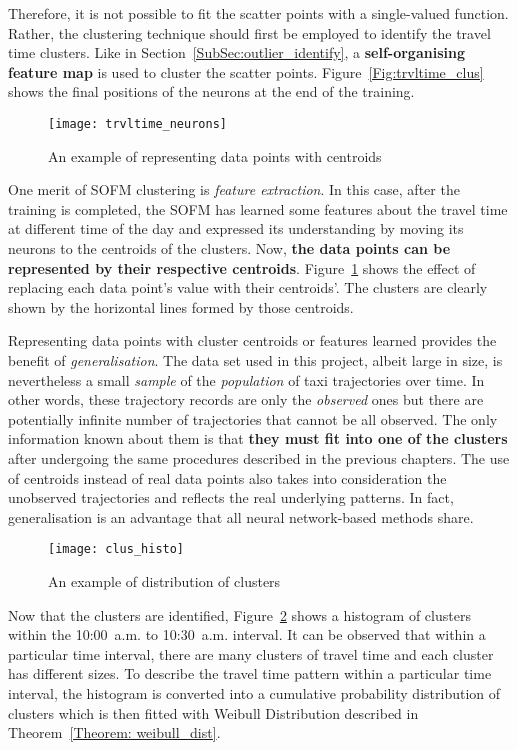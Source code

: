 Therefore, it is not possible to fit the scatter points with a single-valued function. Rather, the clustering technique should first be employed to identify the travel time clusters. Like in Section~\ref{SubSec:outlier_identify}, a \textbf{self-organising feature map} is used to cluster the scatter points. Figure~\ref{Fig:trvltime_clus} shows the final positions of the neurons at the end of the training.

\begin{figure}[h!]
\texttt{[image: trvltime\_neurons]}
\centering
\caption{An example of representing data points with centroids}\label{Fig:trvltime_neurons}
\end{figure}

One merit of SOFM clustering is \emph{feature extraction}. In this case, after the training is completed, the SOFM has learned some features about the travel time at different time of the day and expressed its understanding by moving its neurons to the centroids of the clusters. Now, \textbf{the data points can be represented by their respective centroids}. Figure~\ref{Fig:trvltime_neurons} shows the effect of replacing each data point's value with their centroids'. The clusters are clearly shown by the horizontal lines formed by those centroids. 

Representing data points with cluster centroids or features learned provides the benefit of \emph{generalisation}. The data set used in this project, albeit large in size, is nevertheless a small \emph{sample} of the \emph{population} of taxi trajectories over time. In other words, these trajectory records are only the \emph{observed} ones but there are potentially infinite number of trajectories that cannot be all observed. The only information known about them is that \textbf{they must fit into one of the clusters} after undergoing the same procedures described in the previous chapters. The use of centroids instead of real data points also takes into consideration the unobserved trajectories and reflects the real underlying patterns. In fact, generalisation is an advantage that all neural network-based methods share. 

\begin{figure}[h!]
\texttt{[image: clus\_histo]}
\centering
\caption{An example of distribution of clusters}\label{Fig:clus_histo}
\end{figure}

Now that the clusters are identified, Figure~\ref{Fig:clus_histo} shows a histogram of clusters within the 10:00~a.m. to 10:30~a.m. interval. It can be observed that within a particular time interval, there are many clusters of travel time and each cluster has different sizes. To describe the travel time pattern within a particular time interval, the histogram is converted into a cumulative probability distribution of clusters which is then fitted with Weibull Distribution described in Theorem~\ref{Theorem: weibull_dist}. 


